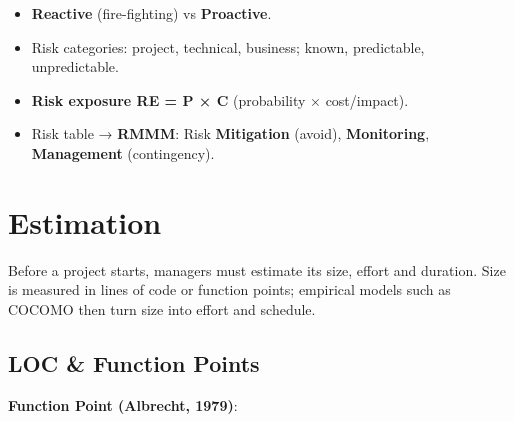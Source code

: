 \begin{itemize}
\tightlist
\item
  \textbf{Reactive} (fire-fighting) vs \textbf{Proactive}.
\item
  Risk categories: project, technical, business; known, predictable, unpredictable.
\item
  \textbf{Risk exposure RE = P × C} (probability × cost/impact).
\item
  Risk table → \textbf{RMMM}: Risk \textbf{Mitigation} (avoid), \textbf{Monitoring}, \textbf{Management} (contingency).
\end{itemize}

\needspace{191pt}

\hypertarget{p2-06--5-estimation}{%
\section{Estimation}\label{p2-06--5-estimation}}

Before a project starts, managers must estimate its size, effort and duration. Size is measured in lines of
code or function points; empirical models such as COCOMO then turn size into effort and schedule.

\needspace{125pt}

\hypertarget{p2-06--51-loc--function-points}{%
\subsection{LOC \& Function Points}\label{p2-06--51-loc--function-points}}

\textbf{Function Point (Albrecht, 1979)}:



\begingroup\small

